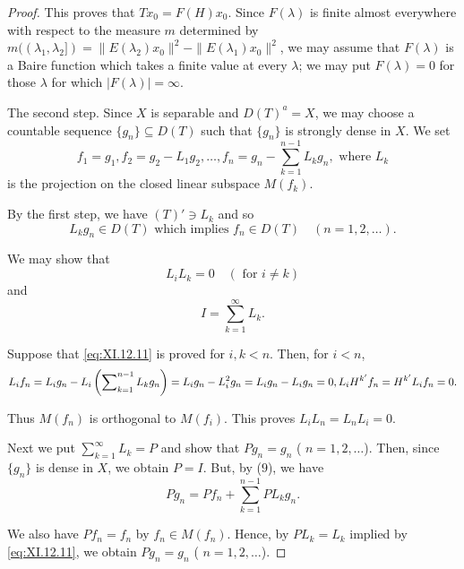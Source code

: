 \begin{proof}
This proves that $Tx_0 = F(H)x_0$. Since $F(\lambda)$ is finite almost everywhere with respect to the measure $m$ determined by $m((\lambda_1, \lambda_2]) = \|E(\lambda_2)x_0\|^2 - \|E(\lambda_1)x_0\|^2$, we may assume that $F(\lambda)$ is a Baire function which takes a finite value at every $\lambda$; we may put $F(\lambda) = 0$ for those $\lambda$ for which $|F(\lambda)| = \infty$. 

The second step. Since $X$ is separable and $D(T)^a = X$, we may choose a countable sequence $\{g_n\} \subseteq D(T)$ such that $\{g_n\}$ is strongly dense in $X$. We set 
\begin{equation}\label{eq:XI.12.9}
f _{1} = g _{1}, f _{2} = g _{2} - L _{1} g _{2}, \dots , f _{n} = g _{n} - \sum\limits_{k=1} ^{n-1} L _{k} g _{n}, \text{ where } L _{k}
\end{equation}
is the projection on the closed linear subspace $M(f_k)$. 


By the first step, we have $(T)' \ni L_k$ and so 
\begin{equation}\label{eq:XI.12.10}
L _{k} g _{n} \in D (T) \text{ which implies } f _{n} \in D (T) \quad (n = 1, 2, \dots).
\end{equation}

We may show that 
\begin{equation}\label{eq:XI.12.11}
L _{i} L _{k} = 0 \quad (\text{ for } i \neq k)
\end{equation}
and 
\begin{equation}\label{eq:XI.12.12}
I = \sum\limits_{k=1} ^{\infty} L _{k}.
\end{equation}

Suppose that \eqref{eq:XI.12.11} is proved for $i, k < n$. Then, for $i < n$, 
\begin{equation}L _{i} f _{n} = L _{i} g _{n} - L _{i} \left(\sum\limits_{k=1} ^{n-1} L _{k} g _{n}\right) = L _{i} g _{n} - L _{i} ^{2} g _{n} = L _{i} g _{n} - L _{i} g _{n} = 0, L _{i} H ^ {k ^{\prime}} f _{n} = H ^ {k ^{\prime}} L _{i} f _{n} = 0. \notag\end{equation}

Thus $M(f_{n})$ is orthogonal to $M(f_{i})$. This proves $L_{i}L_{n}=L_{n}L_{i}=0$. 

Next we put $\sum\limits_{k=1}^{\infty} L_k = P$ and show that $P g_n = g_n$ ( $n = 1, 2, \ldots$). Then, since $\{g_n\}$ is dense in $X$, we obtain $P = I$. But, by ($9$), we have 
\[
P g _{n} = P f _{n} + \sum\limits_{k=1} ^{n-1} P L _{k} g _{n}.
\]

We also have $Pf_{n} = f_{n}$ by $f_{n} \in M(f_{n})$. Hence, by $PL_{k} = L_{k}$ implied by \eqref{eq:XI.12.11}, we obtain $Pg_{n} = g_{n}$ ( $n = 1, 2, \ldots$). 


\end{proof}
